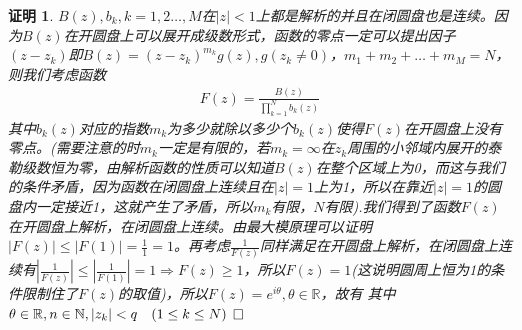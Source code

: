 \documentclass{ctexart}
\newcommand{\。}{．} %
\newenvironment{lanse}{
    \begin{tcolorbox}[breakable,enhanced, colback=qlan, boxrule=0pt, frame hidden,
        borderline west={0.7mm}{0.1mm}{slan}]
    }
    {\end{tcolorbox}}
\theoremstyle{t} %
\newtheorem*{zmhj}{\color{slan} 证明}
\newenvironment{zm}{\begin{lanse}\begin{zmhj}}{$\hfill \square$\end{zmhj}\end{lanse}}
\begin{document}
\begin{zm}
$B(z),b_k,k=1,2\dots,M$在$|z|<1$上都是解析的并且在闭圆盘也是连续。因为$B(z)$在开圆盘上可以展开成级数形式，函数的零点一定可以提出因子$(z-z_k)$即$B(z)=(z-z_k)^{m_{k}}g(z),g(z_k\neq 0)$，$m_1+m_2+\dots +m_M=N$，则我们考虑函数
\begin{align*}
    F(z)=\frac{B(z)}{\prod_{k=1}^{N}b_k(z)}
\end{align*}
其中$b_k(z)$对应的指数$m_k$为多少就除以多少个$b_k(z)$使得$F(z)$在开圆盘上没有零点。(需要注意的时$m_k$一定是有限的，若$m_k=\infty$在$z_k$周围的小邻域内展开的泰勒级数恒为零，由解析函数的性质可以知道$B(z)$在整个区域上为0，而这与我们的条件矛盾，因为函数在闭圆盘上连续且在$|z|=1$上为1，所以在靠近$|z|=1$的圆盘内一定接近1，这就产生了矛盾，所以$m_k$有限，$N$有限).我们得到了函数$F(z)$在开圆盘上解析，在闭圆盘上连续。由最大模原理可以证明$|F(z)|\le |F(1)|=\frac{1}{1}=1$。再考虑$\frac{1}{F(z)}$同样满足在开圆盘上解析，在闭圆盘上连续有$\left|\frac{1}{F(z)}\right|\le \left|\frac{1}{F(1)}\right|=1\Rightarrow F(z)\ge 1$，所以$F(z)=1$(这说明圆周上恒为1的条件限制住了$F(z)$的取值)，所以$F(z)=e^{i\theta},\theta\in\mathbb{R}$，故有
其中$\theta\in \mathbb{R},\space n\in\mathbb{N},\space |z_k|<q\quad (1\le k\le N)$
\end{zm}
\end{document}
